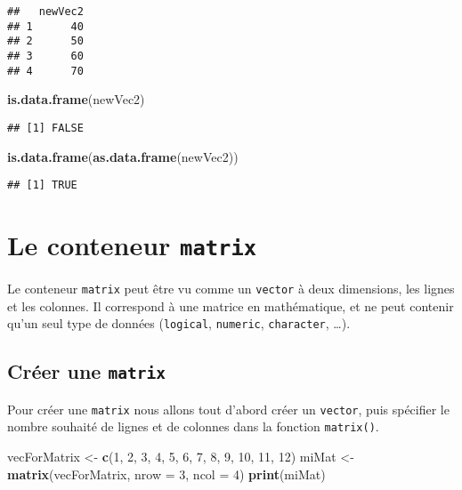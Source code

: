 \documentclass[]{book}
\newenvironment{Shaded}{\begin{snugshade}}{\end{snugshade}}
\newcommand{\KeywordTok}[1]{\textcolor[rgb]{0.13,0.29,0.53}{\textbf{#1}}}
\newcommand{\DataTypeTok}[1]{\textcolor[rgb]{0.13,0.29,0.53}{#1}}
\newcommand{\DecValTok}[1]{\textcolor[rgb]{0.00,0.00,0.81}{#1}}
\newcommand{\StringTok}[1]{\textcolor[rgb]{0.31,0.60,0.02}{#1}}
\newcommand{\NormalTok}[1]{#1}
\theoremstyle{definition}
\theoremstyle{definition}
\theoremstyle{definition}
\theoremstyle{remark}
\begin{document}
\begin{verbatim}
##   newVec2
## 1      40
## 2      50
## 3      60
## 4      70
\end{verbatim}

\begin{Shaded}
\begin{Highlighting}[]
\KeywordTok{is.data.frame}\NormalTok{(newVec2)}
\end{Highlighting}
\end{Shaded}

\begin{verbatim}
## [1] FALSE
\end{verbatim}

\begin{Shaded}
\begin{Highlighting}[]
\KeywordTok{is.data.frame}\NormalTok{(}\KeywordTok{as.data.frame}\NormalTok{(newVec2))}
\end{Highlighting}
\end{Shaded}

\begin{verbatim}
## [1] TRUE
\end{verbatim}

\hypertarget{l014matrix}{\section{\texorpdfstring{Le conteneur
\texttt{matrix}}{Le conteneur matrix}}\label{l014matrix}}

Le conteneur \texttt{matrix} peut être vu comme un \texttt{vector} à
deux dimensions, les lignes et les colonnes. Il correspond à une matrice
en mathématique, et ne peut contenir qu'un seul type de données
(\texttt{logical}, \texttt{numeric}, \texttt{character}, \ldots{}).

\subsection{\texorpdfstring{Créer une
\texttt{matrix}}{Créer une matrix}}\label{creer-une-matrix}

Pour créer une \texttt{matrix} nous allons tout d'abord créer un
\texttt{vector}, puis spécifier le nombre souhaité de lignes et de
colonnes dans la fonction \texttt{matrix()}.

\begin{Shaded}
\begin{Highlighting}[]
\NormalTok{vecForMatrix <-}\StringTok{ }\KeywordTok{c}\NormalTok{(}\DecValTok{1}\NormalTok{, }\DecValTok{2}\NormalTok{, }\DecValTok{3}\NormalTok{, }\DecValTok{4}\NormalTok{, }\DecValTok{5}\NormalTok{, }\DecValTok{6}\NormalTok{, }\DecValTok{7}\NormalTok{, }\DecValTok{8}\NormalTok{, }\DecValTok{9}\NormalTok{, }\DecValTok{10}\NormalTok{, }\DecValTok{11}\NormalTok{, }\DecValTok{12}\NormalTok{)}
\NormalTok{miMat <-}\StringTok{ }\KeywordTok{matrix}\NormalTok{(vecForMatrix, }\DataTypeTok{nrow =} \DecValTok{3}\NormalTok{, }\DataTypeTok{ncol =} \DecValTok{4}\NormalTok{)}
\KeywordTok{print}\NormalTok{(miMat)}
\end{Highlighting}
\end{Shaded}
\end{document}
